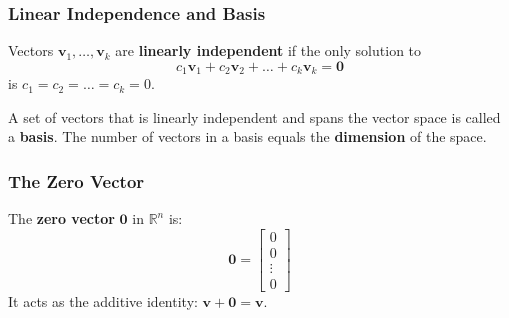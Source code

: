 \subsubsection{Linear Independence and Basis}
Vectors $ \mathbf{v}_1, \ldots, \mathbf{v}_k $ are \textbf{linearly independent} if the only solution to
\begin{equation*}
    c_1 \mathbf{v}_1 + c_2 \mathbf{v}_2 + \ldots + c_k \mathbf{v}_k = \mathbf{0}
\end{equation*}
is $ c_1 = c_2 = \ldots = c_k = 0 $.

A set of vectors that is linearly independent and spans the vector space is called a \textbf{basis}. The number of vectors in a basis equals the \textbf{dimension} of the space.

\subsubsection{The Zero Vector}
The \textbf{zero vector} $ \mathbf{0} $ in $ \mathbb{R}^n $ is:
\begin{equation*}
    \mathbf{0} = \begin{bmatrix}0 \\ 0 \\ \vdots \\ 0\end{bmatrix}
\end{equation*}
It acts as the additive identity: $ \mathbf{v} + \mathbf{0} = \mathbf{v} $.

